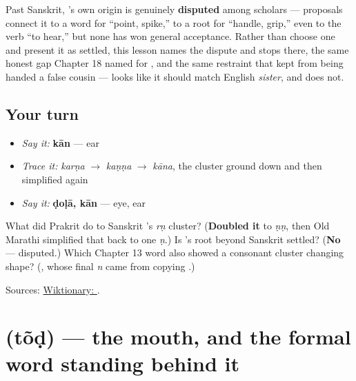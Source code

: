 \begin{cousinweb}
Past Sanskrit, \textbf{}'s own origin is genuinely \textbf{disputed} among scholars — proposals connect it to a word for \textquotedblleft{}point, spike,\textquotedblright{} to a root for \textquotedblleft{}handle, grip,\textquotedblright{} even to the verb \textquotedblleft{}to hear,\textquotedblright{} but none has won general acceptance. Rather than choose one and present it as settled, this lesson names the dispute and stops there, the same honest gap Chapter 18 named for \textbf{}, and the same restraint that kept \textbf{} from being handed a false cousin — \textbf{} looks like it should match English \emph{sister}, and does not.
\end{cousinweb}

\subsection*{Your turn}
\begin{itemize}
\raggedright
  \item \emph{Say it:} \textbf{kān} — ear
  \item \emph{Trace it:} \emph{karṇa} $\to$ \emph{kaṇṇa} $\to$ \emph{kāna}, the cluster ground down and then simplified again
  \item \emph{Say it:} \textbf{ḍoḷā, kān} — eye, ear
\end{itemize}

\begin{tcolorbox}[breakable,colback=teal!4,colframe=teal!35!black,title={Before you move on}]
What did Prakrit do to Sanskrit \textbf{}'s \emph{rṇ} cluster? (\textbf{Doubled it} to \emph{ṇṇ}, then Old Marathi simplified that back to one \emph{ṇ}.) Is \textbf{}'s root beyond Sanskrit settled? (\textbf{No} — disputed.) Which Chapter 13 word also showed a consonant cluster changing shape? (\textbf{}, whose final \emph{n} came from copying \textbf{}.)

Sources: \href{https://en.wiktionary.org/wiki/\%E0\%A4\%95\%E0\%A4\%BE\%E0\%A4\%A8}{Wiktionary: }.
\end{tcolorbox}
\section[\texorpdfstring{\mr{तोंड} (tõḍ)}{तोंड (tõḍ)}]{ (tõḍ) — the mouth, and the formal word standing behind it}

\label{lesson:MR-C12-tond}



